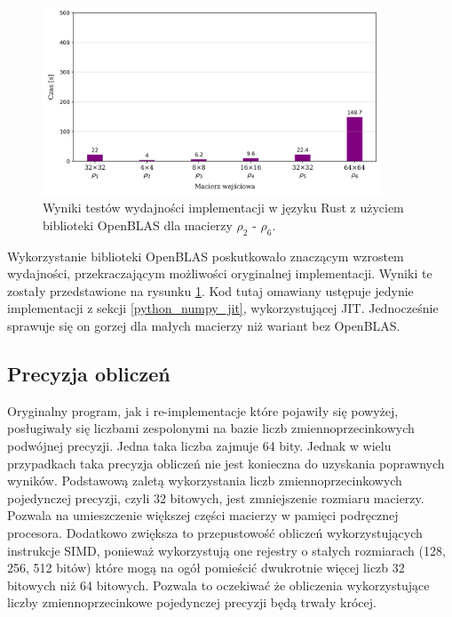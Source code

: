 \documentclass[11pt, a4paper]{article}
\begin{document}
\begin{sloppypar}
    \FloatBarrier
    \begin{figure}[ht]
      \centering
      \includegraphics[width=0.9\textwidth]{"resources/rust_blas_perf_tests.png"}
      \caption{Wyniki testów wydajności implementacji w języku Rust z użyciem biblioteki OpenBLAS dla macierzy $\rho
      _{2}$ - $\rho_{6}$.}
      \label{fifth-perf}
    \end{figure}
    \FloatBarrier

    Wykorzystanie biblioteki OpenBLAS poskutkowało znaczącym wzrostem wydajności,
    przekraczającym możliwości oryginalnej implementacji. Wyniki te zostały przedstawione
    na rysunku \ref{fifth-perf}. Kod tutaj omawiany ustępuje jedynie implementacji z
    sekcji \ref{python_numpy_jit}, wykorzystującej JIT. Jednocześnie sprawuje się on
    gorzej dla małych macierzy niż wariant bez OpenBLAS.

    \subsection{Precyzja obliczeń}


    Oryginalny program, jak i re-implementacje które pojawiły się powyżej, posługiwały
    się liczbami zespolonymi na bazie liczb zmiennoprzecinkowych podwójnej precyzji. Jedna
    taka liczba zajmuje 64 bity. Jednak w wielu przypadkach taka precyzja obliczeń nie
    jest konieczna do uzyskania poprawnych wyników. Podstawową zaletą wykorzystania liczb
    zmiennoprzecinkowych pojedynczej precyzji, czyli 32 bitowych, jest zmniejszenie rozmiaru
    macierzy. Pozwala na umieszczenie większej części macierzy w pamięci podręcznej
    procesora. Dodatkowo zwiększa to przepustowość obliczeń wykorzystujących instrukcje SIMD,
    ponieważ wykorzystują one rejestry o stałych rozmiarach (128, 256, 512 bitów) które
    mogą na ogół pomieścić dwukrotnie więcej liczb 32 bitowych niż 64 bitowych. Pozwala to
    oczekiwać że obliczenia wykorzystujące liczby zmiennoprzecinkowe pojedynczej precyzji
    będą trwały krócej.


\end{sloppypar}
\end{document}
